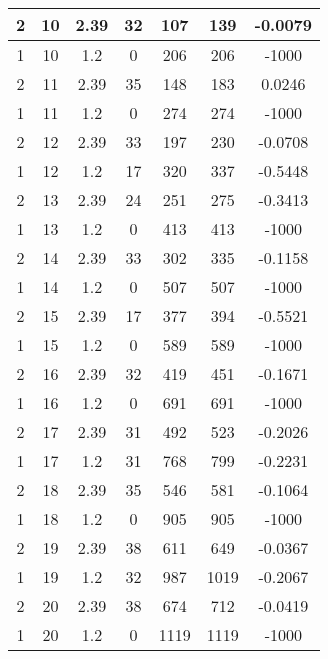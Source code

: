 \documentclass[letterpaper, 12pt]{article}
\begin{document}
\begin{longtable}{|c|c|c|c|c|c|c|}
\hline
2 & 10 & 2.39 & 32 & 107 & 139 & -0.0079 \\
\hline
1 & 10 & 1.2 & 0 & 206 & 206 & -1000 \\
\hline
2 & 11 & 2.39 & 35 & 148 & 183 & 0.0246 \\
\hline
1 & 11 & 1.2 & 0 & 274 & 274 & -1000 \\
\hline
2 & 12 & 2.39 & 33 & 197 & 230 & -0.0708 \\
\hline
1 & 12 & 1.2 & 17 & 320 & 337 & -0.5448 \\
\hline
2 & 13 & 2.39 & 24 & 251 & 275 & -0.3413 \\
\hline
1 & 13 & 1.2 & 0 & 413 & 413 & -1000 \\
\hline
2 & 14 & 2.39 & 33 & 302 & 335 & -0.1158 \\
\hline
1 & 14 & 1.2 & 0 & 507 & 507 & -1000 \\
\hline
2 & 15 & 2.39 & 17 & 377 & 394 & -0.5521 \\
\hline
1 & 15 & 1.2 & 0 & 589 & 589 & -1000 \\
\hline
2 & 16 & 2.39 & 32 & 419 & 451 & -0.1671 \\
\hline
1 & 16 & 1.2 & 0 & 691 & 691 & -1000 \\
\hline
2 & 17 & 2.39 & 31 & 492 & 523 & -0.2026 \\
\hline
1 & 17 & 1.2 & 31 & 768 & 799 & -0.2231 \\
\hline
2 & 18 & 2.39 & 35 & 546 & 581 & -0.1064 \\
\hline
1 & 18 & 1.2 & 0 & 905 & 905 & -1000 \\
\hline
2 & 19 & 2.39 & 38 & 611 & 649 & -0.0367 \\
\hline
1 & 19 & 1.2 & 32 & 987 & 1019 & -0.2067 \\
\hline
2 & 20 & 2.39 & 38 & 674 & 712 & -0.0419 \\
\hline
1 & 20 & 1.2 & 0 & 1119 & 1119 & -1000 \\
\hline
\end{longtable}
\end{document}
